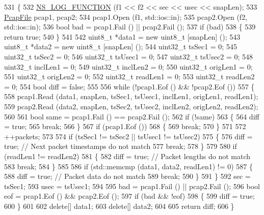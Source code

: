 \begin{DoxyCode}
531 \{
532   \hyperlink{log-macros-disabled_8h_a90b90d5bad1f39cb1b64923ea94c0761}{NS\_LOG\_FUNCTION} (f1 << f2 << sec << usec << snapLen);
533   \hyperlink{classns3_1_1PcapFile_a6bfa1cf38e6845f9d2e77e3c034ed90d}{PcapFile} pcap1, pcap2;
534   pcap1.Open (f1, std::ios::in);
535   pcap2.Open (f2, std::ios::in);
536   \textcolor{keywordtype}{bool} bad = pcap1.Fail () || pcap2.Fail ();
537   \textcolor{keywordflow}{if} (bad)
538     \{
539       \textcolor{keywordflow}{return} \textcolor{keyword}{true};
540     \}
541 
542   uint8\_t *data1 = \textcolor{keyword}{new} uint8\_t [snapLen] ();
543   uint8\_t *data2 = \textcolor{keyword}{new} uint8\_t [snapLen] ();
544   uint32\_t tsSec1 = 0;
545   uint32\_t tsSec2 = 0;
546   uint32\_t tsUsec1 = 0;
547   uint32\_t tsUsec2 = 0;
548   uint32\_t inclLen1 = 0;
549   uint32\_t inclLen2 = 0;
550   uint32\_t origLen1 = 0;
551   uint32\_t origLen2 = 0;
552   uint32\_t readLen1 = 0;
553   uint32\_t readLen2 = 0;
554   \textcolor{keywordtype}{bool} diff = \textcolor{keyword}{false};
555 
556   \textcolor{keywordflow}{while} (!pcap1.Eof () && !pcap2.Eof ())
557     \{
558       pcap1.Read (data1, snapLen, tsSec1, tsUsec1, inclLen1, origLen1, readLen1);
559       pcap2.Read (data2, snapLen, tsSec2, tsUsec2, inclLen2, origLen2, readLen2);
560 
561       \textcolor{keywordtype}{bool} same = pcap1.Fail () == pcap2.Fail ();
562       \textcolor{keywordflow}{if} (!same)
563         \{
564           diff = \textcolor{keyword}{true};
565           \textcolor{keywordflow}{break};
566         \}
567       \textcolor{keywordflow}{if} (pcap1.Eof ())
568         \{
569           \textcolor{keywordflow}{break};
570         \}
571 
572       ++packets;
573       
574       \textcolor{keywordflow}{if} (tsSec1 != tsSec2 || tsUsec1 != tsUsec2)
575         \{
576           diff = \textcolor{keyword}{true}; \textcolor{comment}{// Next packet timestamps do not match}
577           \textcolor{keywordflow}{break};
578         \}
579 
580       \textcolor{keywordflow}{if} (readLen1 != readLen2)
581         \{
582           diff = \textcolor{keyword}{true}; \textcolor{comment}{// Packet lengths do not match}
583           \textcolor{keywordflow}{break};
584         \}
585 
586       \textcolor{keywordflow}{if} (std::memcmp (data1, data2, readLen1) != 0)
587         \{
588           diff = \textcolor{keyword}{true}; \textcolor{comment}{// Packet data do not match}
589           \textcolor{keywordflow}{break};
590         \}
591     \}
592   sec = tsSec1;
593   usec = tsUsec1;
594 
595   bad = pcap1.Fail () || pcap2.Fail ();
596   \textcolor{keywordtype}{bool} eof = pcap1.Eof () && pcap2.Eof ();
597   \textcolor{keywordflow}{if} (bad && !eof)
598     \{
599       diff = \textcolor{keyword}{true};
600     \}
601 
602   \textcolor{keyword}{delete}[] data1;
603   \textcolor{keyword}{delete}[] data2;
604 
605   \textcolor{keywordflow}{return} diff;
606 \}
\end{DoxyCode}


